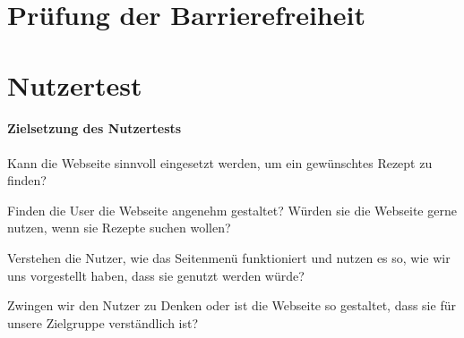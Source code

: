 \documentclass[parskip,10pt,abstracton]{scrartcl}
\begin{document}

\section{Prüfung der Barrierefreiheit}

\section{Nutzertest}
\textbf{Zielsetzung des Nutzertests}\\\\
 Kann die Webseite sinnvoll eingesetzt werden, um ein gewünschtes Rezept zu finden?
 
 Finden die User die Webseite angenehm gestaltet? Würden sie die Webseite gerne nutzen, wenn sie Rezepte suchen wollen?
 
 Verstehen die Nutzer, wie das Seitenmenü funktioniert und nutzen es so, wie wir uns vorgestellt haben, dass sie genutzt werden würde?
 
 Zwingen wir den Nutzer zu Denken oder ist die Webseite so gestaltet, dass sie für unsere Zielgruppe verständlich ist? 
 
\end{document}
